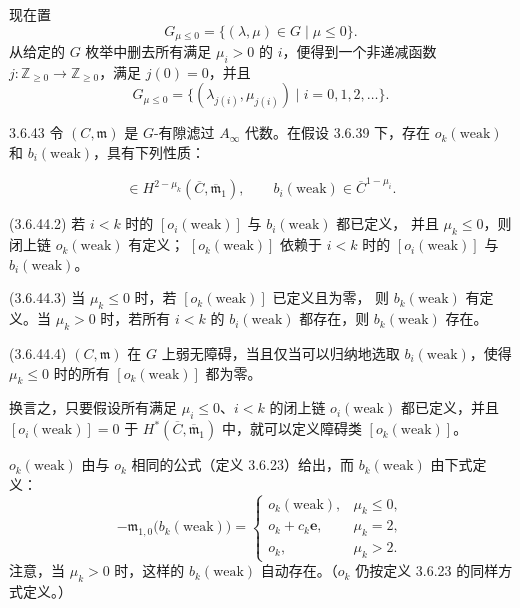 现在置
\begin{equation}
  G_{\mu\leq0}=\{(\lambda,\mu)\in G\mid\mu\leq0\}.
  \tag{3.6.41}\label{eq:3-6-41}
\end{equation}
从给定的 $G$ 枚举中删去所有满足 $\mu_i>0$ 的 $i$，便得到一个非递减函数
$j\colon\mathbb Z_{\geq0}\to\mathbb Z_{\geq0}$，满足 $j(0)=0$，并且
\begin{equation}
  G_{\mu\leq0}
  =\{(\lambda_{j(i)},\mu_{j(i)})\mid i=0,1,2,\ldots\}.
  \tag{3.6.42}\label{eq:3-6-42}
\end{equation}

\begin{theorem}{3.6.43}\label{thm:3-6-43}
令 $(C,\mathfrak m)$ 是 $G$-有隙滤过 $A_\infty$ 代数。在假设 3.6.39
下，存在 $o_k(\mathrm{weak})$ 和 $b_i(\mathrm{weak})$，具有下列性质：

\smallskip
\begin{equation}
  [o_k(\mathrm{weak})]
  \in H^{2-\mu_k}(\overline C,\overline{\mathfrak m}_1),
  \qquad
  b_i(\mathrm{weak})\in\overline C^{1-\mu_i}.
  \tag{3.6.44.1}\label{eq:3-6-44-1}
\end{equation}

\noindent\textup{(3.6.44.2)}
若 $i<k$ 时的 $[o_i(\mathrm{weak})]$ 与 $b_i(\mathrm{weak})$ 都已定义，
并且 $\mu_k\leq0$，则闭上链 $o_k(\mathrm{weak})$ 有定义；
$[o_k(\mathrm{weak})]$ 依赖于 $i<k$ 时的
$[o_i(\mathrm{weak})]$ 与 $b_i(\mathrm{weak})$。

\noindent\textup{(3.6.44.3)}
当 $\mu_k\leq0$ 时，若 $[o_k(\mathrm{weak})]$ 已定义且为零，
则 $b_k(\mathrm{weak})$ 有定义。当 $\mu_k>0$ 时，若所有 $i<k$ 的
$b_i(\mathrm{weak})$ 都存在，则 $b_k(\mathrm{weak})$ 存在。

\noindent\textup{(3.6.44.4)}
$(C,\mathfrak m)$ 在 $G$ 上弱无障碍，当且仅当可以归纳地选取
$b_i(\mathrm{weak})$，使得 $\mu_k\leq0$ 时的所有
$[o_k(\mathrm{weak})]$ 都为零。
\end{theorem}

换言之，只要假设所有满足 $\mu_i\leq0$、$i<k$ 的闭上链
$o_i(\mathrm{weak})$ 都已定义，并且
$[o_i(\mathrm{weak})]=0$ 于
$H^*(\overline C,\overline{\mathfrak m}_1)$ 中，就可以定义障碍类
$[o_k(\mathrm{weak})]$。

$o_k(\mathrm{weak})$ 由与 $o_k$ 相同的公式（定义 3.6.23）给出，而
$b_k(\mathrm{weak})$ 由下式定义：
\begin{equation}
  -\mathfrak m_{1,0}\bigl(b_k(\mathrm{weak})\bigr)
  =
  \begin{cases}
    o_k(\mathrm{weak}),&\mu_k\leq0,\\
    o_k+c_k\mathbf e,&\mu_k=2,\\
    o_k,&\mu_k>2.
  \end{cases}
  \tag{3.6.45}\label{eq:3-6-45}
\end{equation}
注意，当 $\mu_k>0$ 时，这样的 $b_k(\mathrm{weak})$ 自动存在。（$o_k$
仍按定义 3.6.23 的同样方式定义。）

